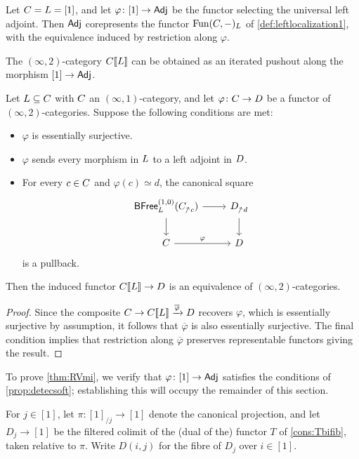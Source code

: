 \documentclass[a4paper,reqno,twoside]{amsart}
\begin{document}
\begin{theorem}\label{thm:RVmi}
	Let $\relax{C}=\relax{L}=[1]$, and let $\varphi \colon [1] \to \mathsf{Adj}$ be the functor selecting the universal left adjoint. Then $\mathsf{Adj}$ corepresents the functor $\mathrm{Fun}(\relax{C},-)_{\relax{L}}$ of \cref{def:leftlocalization1}, with the equivalence induced by restriction along $\varphi$.
\end{theorem}


\begin{corollary}\label{cor:esssurj}
	The $(\infty,2)$-category $\relax{C}[\![\relax{L}]\!]$ can be obtained as an iterated pushout along the morphism $[1] \to \mathsf{Adj}$. 
\end{corollary}


\begin{proposition}\label{prop:detecsoft}
	Let $\relax{L} \subseteq \relax{C}$ with $\relax{C}$ an $(\infty,1)$-category, and let $\varphi \colon \relax{C} \to \relax{D}$ be a functor of $(\infty,2)$-categories. Suppose the following conditions are met:
	\begin{itemize}
		\item $\varphi$ is essentially surjective.
		\item $\varphi$ sends every morphism in $\relax{L}$ to a left adjoint in $\relax{D}$.
		\item For every $c \in \relax{C}$ and $\varphi(c)\simeq d$, the canonical square
		\[
			\begin{tikzcd}
				\BFree^{(1,0)}_{\cL}(\cC_{\upslash c}) \arrow[d] \arrow[r] & \cD_{ \upslash d} \arrow[d] \\
				\cC \arrow[r,"\varphi"] & \cD
			\end{tikzcd}
		\]
		is a pullback.
	\end{itemize}
	Then the induced functor $\relax{C}[\![\relax{L}]\!] \to \relax{D}$ is an equivalence of $(\infty,2)$-categories.
\end{proposition}
\begin{proof}
	Since the composite $\relax{C} \to \relax{C}[\![\relax{L}]\!] \xrightarrow{\overline{\varphi}} \relax{D}$ recovers $\varphi$, which is essentially surjective by assumption, it follows that $\overline{\varphi}$ is also essentially surjective. The final condition implies that restriction along $\overline{\varphi}$ preserves representable functors giving the result.
\end{proof}

To prove \cref{thm:RVmi}, we verify that $\varphi \colon [1] \to \mathsf{Adj}$ satisfies the conditions of \cref{prop:detecsoft}; establishing this will occupy the remainder of this section.

\begin{notation}
	For $j \in [1]$, let $\pi \colon [1]_{/j} \to [1]$ denote the canonical projection, and let $D_j \to [1]$ be the filtered colimit of the (dual of the) functor $T$ of \cref{cons:Tbifib}, taken relative to $\pi$. Write $D(i,j)$ for the fibre of $D_j$ over $i \in [1]$.
\end{notation}
\end{document}
